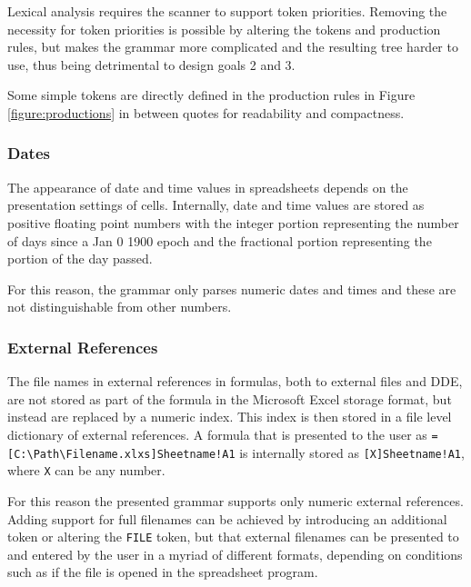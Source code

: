 \documentclass[conference]{IEEEtran}
\begin{document}
Lexical analysis requires the scanner to support token priorities. Removing the necessity for token priorities is possible by altering the tokens and production rules, but makes the grammar more complicated and the resulting tree harder to use, thus being detrimental to design goals 2 and 3.

Some simple tokens are directly defined in the production rules in Figure \ref{figure:productions} in between quotes for readability and compactness.

\subsubsection{\textbf{Dates}}

The appearance of date and time values in spreadsheets depends on the presentation settings of cells. Internally, date and time values are stored as positive floating point numbers with the integer portion representing the number of days since a Jan 0 1900 epoch and the fractional portion representing the portion of the day passed.

For this reason, the grammar only parses numeric dates and times and these are not distinguishable from other numbers.

\subsubsection{\textbf{External References}}

The file names in external references in formulas, both to external files and DDE, are not stored as part of the formula in the Microsoft Excel storage format, but instead are replaced by a numeric index.
This index is then stored in a file level dictionary of external references.
A formula that is presented to the user as \texttt{=[C:\textbackslash Path\textbackslash Filename.xlxs]Sheetname!A1} is internally stored as \texttt{[X]Sheetname!A1}, where \texttt{X} can be any number.

For this reason the presented grammar supports only numeric external references.
Adding support for full filenames can be achieved by introducing an additional token or altering the \texttt{FILE} token, but that external filenames can be presented to and entered by the user in a myriad of different formats, depending on conditions such as if the file is opened in the spreadsheet program.
\end{document}
